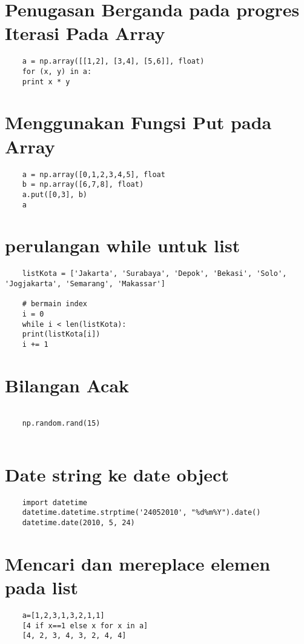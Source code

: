 \documentclass[12pt]{article} %
\begin{document}
\section {Penugasan Berganda pada progres Iterasi Pada Array}
\begin{lstlisting}
	a = np.array([[1,2], [3,4], [5,6]], float)
	for (x, y) in a:
	print x * y
\end{lstlisting}

\section {Menggunakan Fungsi Put pada Array}
\begin{lstlisting}
	a = np.array([0,1,2,3,4,5], float
	b = np.array([6,7,8], float)
	a.put([0,3], b)
	a
\end{lstlisting}

\section {perulangan while untuk list}
\begin{lstlisting}
	listKota = ['Jakarta', 'Surabaya', 'Depok', 'Bekasi', 'Solo', 'Jogjakarta', 'Semarang', 'Makassar']
	
	# bermain index
	i = 0
	while i < len(listKota):
	print(listKota[i])
	i += 1
\end{lstlisting}

\section {Bilangan Acak}
\begin{lstlisting}
	
	np.random.rand(15)
	
\end{lstlisting}

\section {Date string ke date object}
\begin{lstlisting}
	import datetime
	datetime.datetime.strptime('24052010', "%d%m%Y").date()
	datetime.date(2010, 5, 24)
\end{lstlisting}

\section {Mencari dan mereplace elemen pada list}
\begin{lstlisting}
	a=[1,2,3,1,3,2,1,1]
	[4 if x==1 else x for x in a]
	[4, 2, 3, 4, 3, 2, 4, 4]
\end{lstlisting}
\end{document}
